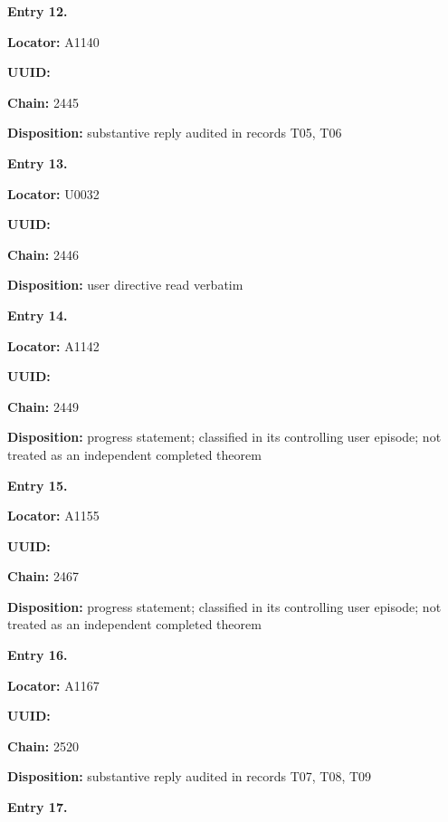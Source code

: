 \documentclass[10pt,a4paper,oneside]{report}
\begin{document}

\textbf{Entry 12.}

\textbf{Locator:} A1140

\textbf{UUID:} \protect{}

\textbf{Chain:} 2445

\textbf{Disposition:} substantive reply audited in records T05, T06


\textbf{Entry 13.}

\textbf{Locator:} U0032

\textbf{UUID:} \protect{}

\textbf{Chain:} 2446

\textbf{Disposition:} user directive read verbatim


\textbf{Entry 14.}

\textbf{Locator:} A1142

\textbf{UUID:} \protect{}

\textbf{Chain:} 2449

\textbf{Disposition:} progress statement; classified in its controlling
user episode; not treated as an independent completed theorem


\textbf{Entry 15.}

\textbf{Locator:} A1155

\textbf{UUID:} \protect{}

\textbf{Chain:} 2467

\textbf{Disposition:} progress statement; classified in its controlling
user episode; not treated as an independent completed theorem


\textbf{Entry 16.}

\textbf{Locator:} A1167

\textbf{UUID:} \protect{}

\textbf{Chain:} 2520

\textbf{Disposition:} substantive reply audited in records T07, T08, T09


\textbf{Entry 17.}
\end{document}
